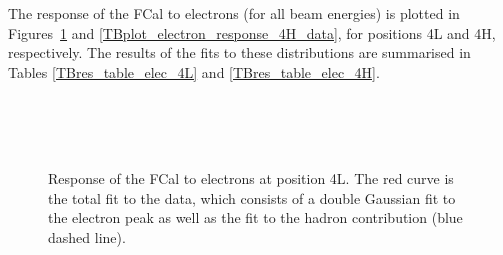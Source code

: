 The response of the FCal to electrons (for all beam energies) is plotted in Figures~\ref{TBplot_electron_response_4L_data} and \ref{TBplot_electron_response_4H_data}, for positions 4L and 4H, respectively. The results of the fits to these distributions are summarised in Tables \ref{TBres_table_elec_4L} and \ref{TBres_table_elec_4H}. 
\begin{figure}[tbp]
\begin{center}
\\
\\
\\
\end{center}
\caption[Response of the FCal to electrons at position 4L]{Response of the FCal to electrons at position 4L. The red curve is the total fit to the data, which consists of a double Gaussian fit to the electron peak as well as the fit to the hadron contribution (blue dashed line).}
\label{TBplot_electron_response_4L_data}
\end{figure}








